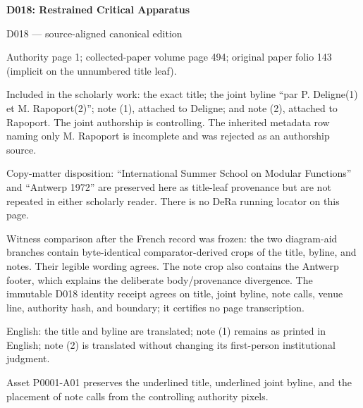 \documentclass[11pt,a4paper]{article}
\begin{document}
\begin{titlepage}\color{DeligneBlue}\vspace*{30mm}
{\fontsize{24}{30}\selectfont\bfseries D018: Restrained Critical Apparatus\par}
\vspace{8mm}{\Large P. Deligne and M. Rapoport\par}
\vspace{8mm}{\large Page-aligned authority, copy-matter, witness, and fallback notes\par}
\vfill{\small D018 --- source-aligned canonical edition\par}
\end{titlepage}
\tableofcontents\clearpage
\hypertarget{D018-P0001}{}
\par\smallskip
Authority page 1; collected-paper volume page 494; original paper folio 143 (implicit on the unnumbered title leaf).

Included in the scholarly work: the exact title; the joint byline “par P. Deligne(1) et M. Rapoport(2)”; note (1), attached to Deligne; and note (2), attached to Rapoport. The joint authorship is controlling. The inherited metadata row naming only M. Rapoport is incomplete and was rejected as an authorship source.

Copy-matter disposition: “International Summer School on Modular Functions” and “Antwerp 1972” are preserved here as title-leaf provenance but are not repeated in either scholarly reader. There is no DeRa running locator on this page.

Witness comparison after the French record was frozen: the two diagram-aid branches contain byte-identical comparator-derived crops of the title, byline, and notes. Their legible wording agrees. The note crop also contains the Antwerp footer, which explains the deliberate body/provenance divergence. The immutable D018 identity receipt agrees on title, joint byline, note calls, venue line, authority hash, and boundary; it certifies no page transcription.

English: the title and byline are translated; note (1) remains as printed in English; note (2) is translated without changing its first-person institutional judgment.

Asset P0001-A01 preserves the underlined title, underlined joint byline, and the placement of note calls from the controlling authority pixels.
\end{document}
